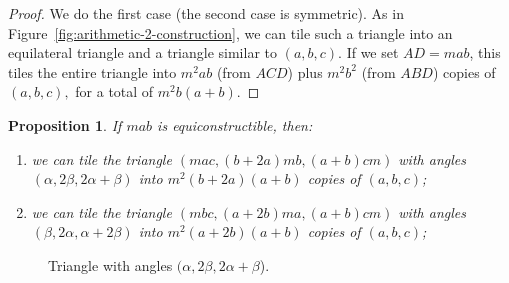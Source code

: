 \documentclass{amsart}
\theoremstyle{plain}
\newtheorem{prop}[thm]{Proposition}
\newtheorem{cor}{Corollary}
\theoremstyle{definition}
\begin{document}
\begin{proof}
We do the first case (the second case is symmetric). As in Figure~\ref{fig:arithmetic-2-construction}, we can tile such a triangle into an equilateral triangle and a triangle similar to $(a,b,c)$. If we set $AD = mab$, this tiles the entire triangle into $m^2ab$ (from $ACD$) plus $m^2b^2$ (from $ABD$) copies of $(a,b,c),$ for a total of $m^2b(a+b)$.
\end{proof}

\begin{prop}
    \label{prop:odd-construction} If $mab$ is equiconstructible, then:
    \begin{enumerate}
        \item we can tile the triangle $(mac, (b+2a)mb, (a+b)cm)$ with angles $(\alpha, 2\beta, 2\alpha+\beta)$ into $m^2(b+2a)(a+b)$ copies of $(a,b,c)$;
        \item we can tile the triangle $(mbc, (a+2b)ma, (a+b)cm)$ with angles $(\beta, 2\alpha, \alpha+2\beta)$ into $m^2(a+2b)(a+b)$ copies of $(a,b,c)$;
    \end{enumerate} 
\end{prop}
\begin{figure}
    \centering

    
    \caption{Triangle with angles $(\alpha, 2\beta, 2\alpha+\beta$).}
    \label{fig:odd-construction}
\end{figure}
\end{document}
